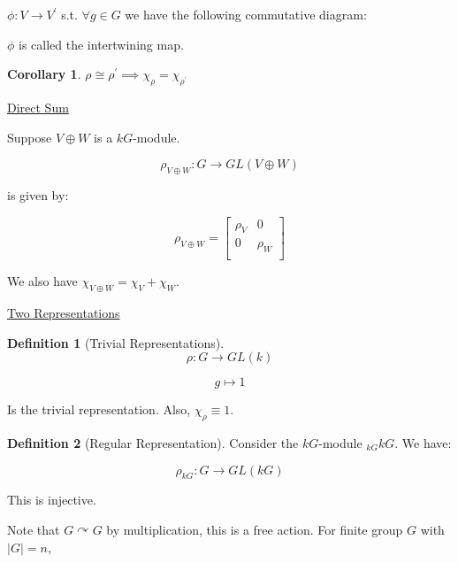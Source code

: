 \documentclass{article}
\theoremstyle{definition}
\newtheorem*{definition}{Definition}
\newtheorem{corollary}[theorem]{Corollary}
\newcommand{\acts}{\curvearrowright}
\begin{document}
\(\phi : V \to V^{\prime}\) s.t. \(\forall g\in G\) we have the following commutative diagram:

\begin{center}
\end{center}

\(\phi\) is called the intertwining map. 

\begin{corollary}
    \(\rho \cong \rho ^{\prime} \implies \chi_{\rho} =\chi_{\rho^{\prime} }\) 
\end{corollary}

\underline{Direct Sum}

Suppose \(V \oplus W\) is a \(kG\)-module.

\[
    \rho_{V \oplus W} : G \to GL(V \oplus W)
\]

is given by:

\[
    \rho_{V \oplus W} = \begin{bmatrix}
        \rho_V &  0 \\
        0 &  \rho_W \\
    \end{bmatrix}
\]

We also have \(\chi_{V \oplus W} = \chi_V + \chi_W\).

\underline{Two Representations}

\begin{definition}
    [Trivial Representations]

    \[
        \rho : G \to GL(k)
    \]

    \[
        g \mapsto 1
    \]

    Is the trivial representation. Also, \(\chi_{\rho} \equiv 1\).
\end{definition}

\begin{definition}
    [Regular Representation]

    Consider the \(kG\)-module \(_{kG}kG\). We have:

    \[
        \rho_{kG} : G \to GL(kG)
    \]

    This is injective.
\end{definition}

Note that \(G \acts G\) by multiplication, this is a free action. For finite group \(G\) with \(\vert G \vert = n\),
\end{document}
